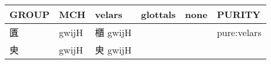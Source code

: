 \documentclass[14pt,a4paper]{scrartcl}
\begin{document}
\begin{longtable}[c]{@{}llllll@{}}
\toprule
\begin{minipage}[b]{0.14\columnwidth}\raggedright\strut
GROUP
\strut\end{minipage} &
\begin{minipage}[b]{0.14\columnwidth}\raggedright\strut
MCH
\strut\end{minipage} &
\begin{minipage}[b]{0.14\columnwidth}\raggedright\strut
velars
\strut\end{minipage} &
\begin{minipage}[b]{0.14\columnwidth}\raggedright\strut
glottals
\strut\end{minipage} &
\begin{minipage}[b]{0.14\columnwidth}\raggedright\strut
none
\strut\end{minipage} &
\begin{minipage}[b]{0.14\columnwidth}\raggedright\strut
PURITY
\strut\end{minipage}\tabularnewline
\midrule
\endhead
\begin{minipage}[t]{0.14\columnwidth}\raggedright\strut
匱
\strut\end{minipage} &
\begin{minipage}[t]{0.14\columnwidth}\raggedright\strut
gwijH
\strut\end{minipage} &
\begin{minipage}[t]{0.14\columnwidth}\raggedright\strut
櫃 gwijH
\strut\end{minipage} &
\begin{minipage}[t]{0.14\columnwidth}\raggedright\strut
\strut\end{minipage} &
\begin{minipage}[t]{0.14\columnwidth}\raggedright\strut
\strut\end{minipage} &
\begin{minipage}[t]{0.14\columnwidth}\raggedright\strut
pure:velars
\strut\end{minipage}\tabularnewline
\begin{minipage}[t]{0.14\columnwidth}\raggedright\strut
㬰
\strut\end{minipage} &
\begin{minipage}[t]{0.14\columnwidth}\raggedright\strut
gwijH
\strut\end{minipage} &
\begin{minipage}[t]{0.14\columnwidth}\raggedright\strut
㬰 gwijH
\strut\end{minipage} &
\begin{minipage}[t]{0.14\columnwidth}\raggedright\strut

\end{minipage}
\end{longtable}
\end{document}
